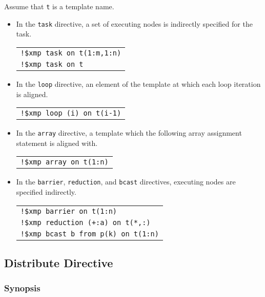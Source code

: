 Assume that {\tt t} is a template name. 

\begin{itemize}
\item In the {\tt task} directive, a set of executing nodes is indirectly specified for the task.

\begin{tabular}{l}
\verb|!$xmp task on t(1:m,1:n)| \\
\verb|!$xmp task on t| \\
\end{tabular}

\item In the {\tt loop} directive, an element of the template at which each loop iteration is aligned.

\begin{tabular}{l}
\verb|!$xmp loop (i) on t(i-1)| \\
\end{tabular}

\item In the {\tt array} directive, a template which the following array assignment statement is aligned with.

\begin{tabular}{l}
\verb|!$xmp array on t(1:n)| \\
\end{tabular}

\item In the {\tt barrier}, {\tt reduction}, and {\tt bcast} directives,
executing nodes are specified indirectly. 

\begin{tabular}{l}
\verb|!$xmp barrier on t(1:n)| \\
\verb|!$xmp reduction (+:a) on t(*,:)| \\
\verb|!$xmp bcast b from p(k) on t(1:n)| \\
\end{tabular}

\end{itemize}

\subsection{Distribute Directive}

\subsubsection*{Synopsis}

